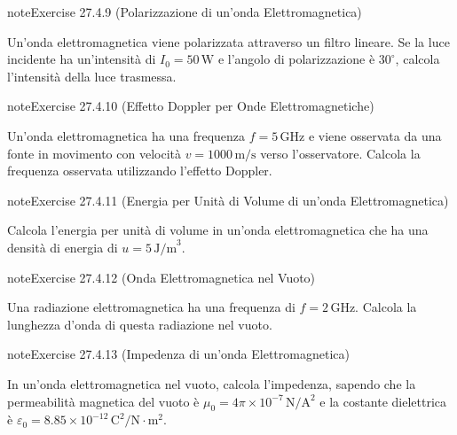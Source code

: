\documentclass[letterpaper,10pt,italian]{jupyterBook}
\begin{document}
\begin{sphinxadmonition}{note}{Exercise 27.4.9 (Polarizzazione di un’onda Elettromagnetica)}



\sphinxAtStartPar
Un’onda elettromagnetica viene polarizzata attraverso un filtro lineare. Se la luce incidente ha un’intensità di \(I_0 = 50 \, \text{W}\) e l’angolo di polarizzazione è \(30^\circ\), calcola l’intensità della luce trasmessa.
\end{sphinxadmonition}
 \label{exercise:ch/electromagnetism/em-waves-problems-exercise-9}

\begin{sphinxadmonition}{note}{Exercise 27.4.10 (Effetto Doppler per Onde Elettromagnetiche)}



\sphinxAtStartPar
Un’onda elettromagnetica ha una frequenza \(f = 5 \, \text{GHz}\) e viene osservata da una fonte in movimento con velocità \(v = 1000 \, \text{m/s}\) verso l’osservatore. Calcola la frequenza osservata utilizzando l’effetto Doppler.
\end{sphinxadmonition}
 \label{exercise:ch/electromagnetism/em-waves-problems-exercise-10}

\begin{sphinxadmonition}{note}{Exercise 27.4.11 (Energia per Unità di Volume di un’onda Elettromagnetica)}



\sphinxAtStartPar
Calcola l’energia per unità di volume in un’onda elettromagnetica che ha una densità di energia di \(u = 5 \, \text{J/m}^3\).
\end{sphinxadmonition}
 \label{exercise:ch/electromagnetism/em-waves-problems-exercise-11}

\begin{sphinxadmonition}{note}{Exercise 27.4.12 (Onda Elettromagnetica nel Vuoto)}



\sphinxAtStartPar
Una radiazione elettromagnetica ha una frequenza di \(f = 2 \, \text{GHz}\). Calcola la lunghezza d’onda di questa radiazione nel vuoto.
\end{sphinxadmonition}
 \label{exercise:ch/electromagnetism/em-waves-problems-exercise-12}

\begin{sphinxadmonition}{note}{Exercise 27.4.13 (Impedenza di un’onda Elettromagnetica)}



\sphinxAtStartPar
In un’onda elettromagnetica nel vuoto, calcola l’impedenza, sapendo che la permeabilità magnetica del vuoto è \(\mu_0 = 4\pi \times 10^{-7} \, \text{N}/\text{A}^2\) e la costante dielettrica è \(\varepsilon_0 = 8.85 \times 10^{-12} \, \text{C}^2/\text{N} \cdot \text{m}^2\).
\end{sphinxadmonition}
 \label{exercise:ch/electromagnetism/em-waves-problems-exercise-13}
\end{document}

